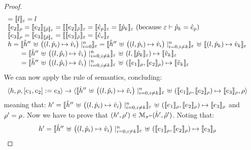 \begin{proof}
$$\begin{array}{l}
    = \symbeval{\loc}{\senv} = \loc \\ 
  \symbeval{\jsilexpr_2}{\store}  = \symbeval{\jsilexpr_2}{\semexpr{\sstore}{\senv}} =  \symbeval{\symbeval{\jsilexpr_2}{\sstore}}{\senv}
   =  \symbeval{\sexpr_p}{\senv} = \symbeval{\sexprp_k}{\senv}  \text{ (because $\senv \vdash \sexprp_k = \sexpr_p$)} \\
  \symbeval{\jsilexpr_3}{\store}  = \symbeval{\jsilexpr_3}{\semexpr{\sstore}{\senv}} =  \symbeval{\symbeval{\jsilexpr_3}{\sstore}}{\senv}
   =  \symbeval{\sexpr_v}{\senv} \\
 \heap = \semexpr{\sheap'' \, \uplus \, \big((l, \sexprp_i) \mapsto \sexprv_i\big)\mid_{i = 0}^n}{\senv} 
       =  \semexpr{\sheap'' \, \uplus \, \big((l, \sexprp_i) \mapsto \sexprv_i\big)\mid_{i = 0, i \neq k}^n}{\senv} \dunion \semexpr{(l, \sexprp_k) \mapsto \sexprv_k}{\senv} \\
         \qquad = \semexpr{\sheap'' \, \uplus \, \big((l, \sexprp_i) \mapsto \sexprv_i\big)\mid_{i = 0, i \neq k}^n}{\senv} \dunion (l, \semexpr{\sexprp_k}{\senv}) \mapsto \semexpr{\sexprv_k}{\senv}  \\ 
         \qquad =  \semexpr{\sheap'' \, \uplus \, \big((l, \sexprp_i) \mapsto \sexprv_i\big)\mid_{i = 0, i \neq k}^n}{\senv} \dunion (\symbeval{\jsilexpr_1}{\store}, \symbeval{\jsilexpr_2}{\store}) \mapsto \semexpr{\sexprv_k}{\senv} \\ 
\end{array}
$$
We can now apply the  rule of \jsil semantics, concluding: 
$$
   \semtrans{\heap, \store, [\jsilexpr_1, \jsilexpr_2] := \jsilexpr_3}
     {\semexpr{\sheap'' \, \uplus \, \big((l, \sexprp_i) \mapsto \sexprv_i\big)\mid_{i = 0, i \neq k}^n}{\senv} \dunion (\symbeval{\jsilexpr_1}{\store}, \symbeval{\jsilexpr_2}{\store}) \mapsto \symbeval{\jsilexpr_3}{\store},  \store}
$$
meaning that: 
$\heap' = \symbeval{\sheap'' \, \uplus \, \big((l, \sexprp_i) \mapsto \sexprv_i\big)\mid_{i = 0, i \neq k}^n}{\senv} \dunion (\symbeval{\jsilexpr_1}{\store}, \symbeval{\jsilexpr_2}{\store}) \mapsto \symbeval{\jsilexpr_3}{\store}$ and 
$\store' = \store$.
Now we have to prove that $(\heap', \store') \in \smodels{\sheap', \sstore'}{\pc''}$.
Noting that:
$$
\begin{array}{l}
\heap' = \symbeval{\sheap'' \, \uplus \, \big((l, \sexprp_i) \mapsto \sexprv_i\big)\mid_{i = 0, i \neq k}^n}{\senv} \dunion (\symbeval{\jsilexpr_1}{\store}, \symbeval{\jsilexpr_2}{\store}) \mapsto \symbeval{\jsilexpr_3}{\store} \\ 

\end{array}$$
\end{proof}
